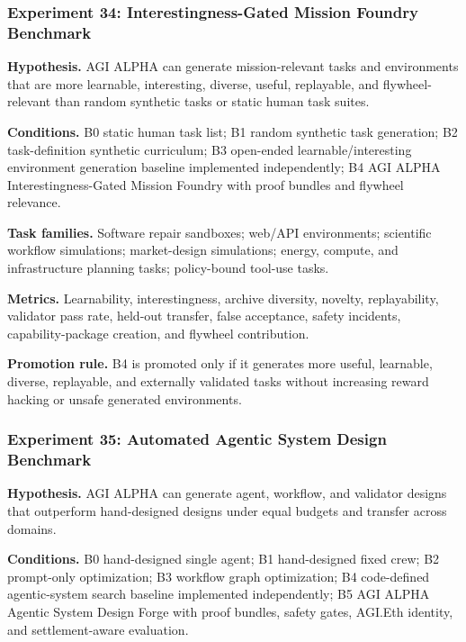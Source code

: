 \documentclass[
  11pt,
]{article}
\begin{document}
\subsubsection{Experiment 34: Interestingness-Gated Mission Foundry
Benchmark}\label{experiment-34-interestingness-gated-mission-foundry-benchmark}

\textbf{Hypothesis.} AGI ALPHA can generate mission-relevant tasks and
environments that are more learnable, interesting, diverse, useful,
replayable, and flywheel-relevant than random synthetic tasks or static
human task suites.

\textbf{Conditions.} B0 static human task list; B1 random synthetic task
generation; B2 task-definition synthetic curriculum; B3 open-ended
learnable/interesting environment generation baseline implemented
independently; B4 AGI ALPHA Interestingness-Gated Mission Foundry with
proof bundles and flywheel relevance.

\textbf{Task families.} Software repair sandboxes; web/API environments;
scientific workflow simulations; market-design simulations; energy,
compute, and infrastructure planning tasks; policy-bound tool-use tasks.

\textbf{Metrics.} Learnability, interestingness, archive diversity,
novelty, replayability, validator pass rate, held-out transfer, false
acceptance, safety incidents, capability-package creation, and flywheel
contribution.

\textbf{Promotion rule.} B4 is promoted only if it generates more
useful, learnable, diverse, replayable, and externally validated tasks
without increasing reward hacking or unsafe generated environments.

\subsubsection{Experiment 35: Automated Agentic System Design
Benchmark}\label{experiment-35-automated-agentic-system-design-benchmark}

\textbf{Hypothesis.} AGI ALPHA can generate agent, workflow, and
validator designs that outperform hand-designed designs under equal
budgets and transfer across domains.

\textbf{Conditions.} B0 hand-designed single agent; B1 hand-designed
fixed crew; B2 prompt-only optimization; B3 workflow graph optimization;
B4 code-defined agentic-system search baseline implemented
independently; B5 AGI ALPHA Agentic System Design Forge with proof
bundles, safety gates, AGI.Eth identity, and settlement-aware
evaluation.
\end{document}
